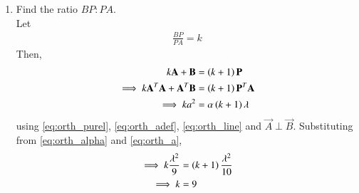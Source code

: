 \documentclass[journal,12pt,twocolumn]{IEEEtran}
\renewcommand\thesection{\arabic{section}}
\begin{document}
\begin{enumerate}[label=\thesection.\arabic*
,ref=\thesection.\theenumi]
\item Find the ratio $BP:PA$.
\\
\solution Let
\begin{align}
\frac{BP}{PA}= k
\end{align}
%
Then, 
\begin{align}
k\mathbf{A} + \mathbf{B} &= \left(k+1\right)\mathbf{P}
\\
\implies k\mathbf{A}^T\mathbf{A} + \mathbf{A}^T\mathbf{B} &= \left(k+1\right)\mathbf{P}^T\mathbf{A}
\\
\implies ka^2  &= \alpha\left(k+1\right)\lambda
\end{align}
%
using \eqref{eq:orth_purel},  \eqref{eq:orth_adef}, \eqref{eq:orth_line} and $\vec{A}\perp \vec{B}$. 
Substituting from \eqref{eq:orth_alpha} and 
\eqref{eq:orth_a},
\begin{align}
\implies k\frac{\lambda^2}{9}  &= \left(k+1\right)\frac{\lambda^2}{10}
\\
\implies k  &= 9
\end{align}

\end{enumerate}
\end{document}
